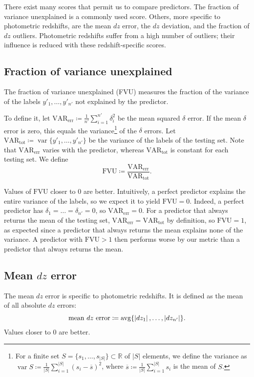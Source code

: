 \documentclass[11pt,twoside,openright]{report}
\newcommand\bbR{\mathbb{R}}
\newcommand\abs[1]{\left|#1\right|}
\DeclareMathOperator{\var}{var}
\DeclareMathOperator{\avg}{avg}
\begin{document}
There exist many scores that permit us to compare predictors. The fraction of variance unexplained is a commonly used score. Others, more specific to photometric redshifts, are the mean $dz$ error, the $dz$ deviation, and the fraction of $dz$ outliers. Photometric redshifts suffer from a high number of outliers; their influence is reduced with these redshift-specific scores.

\subsection{Fraction of variance unexplained}
\label{sec:fvu}
The fraction of variance unexplained (FVU) measures the fraction of the variance of the labels $y'_1, \dots, y'_{n'}$ not explained by the predictor.

To define it, let $\mathrm{VAR_{err}} \coloneqq \frac{1}{n'}\sum_{i=1}^{n'}\delta_i^2$ be the mean squared $\delta$ error. If the mean $\delta$ error is zero, this equals the variance\footnote{For a finite set $S = \{s_1, \dots, s_{\abs{S}}\} \subset \bbR$ of $\abs{S}$ elements, we define the variance as $\var S \coloneqq \frac1{\abs{S}}\sum_{i=1}^{\abs{S}}(s_i - \overline{s})^2$, where $\overline{s} \coloneqq \frac1{\abs{S}}\sum_{i=1}^{\abs{S}}s_i$ is the mean of $S$.} of the $\delta$ errors. Let $\mathrm{VAR_{tot}} \coloneqq \var\{y'_1, \dots, y'_{n'}\}$ be the variance of the labels of the testing set. Note that $\mathrm{VAR_{err}}$ varies with the predictor, whereas $\mathrm{VAR_{tot}}$ is constant for each testing set. We define \[
  \mathrm{FVU} \coloneqq \frac{\mathrm{VAR_{err}}}{\mathrm{VAR_{tot}}} \text{.}
\]

Values of $\mathrm{FVU}$ closer to $0$ are better. Intuitively, a perfect predictor explains the entire variance of the labels, so we expect it to yield $\mathrm{FVU} = 0$. Indeed, a perfect predictor has $\delta_1 = \dots = \delta_{n'} = 0$, so $\mathrm{VAR_{err}} = 0$. For a predictor that always returns the mean of the testing set, $\mathrm{VAR_{err}} = \mathrm{VAR_{tot}}$ by definition, so $\mathrm{FVU} = 1$, as expected since a predictor that always returns the mean explains none of the variance. A predictor with $\mathrm{FVU} > 1$ then performs worse by our metric than a predictor that always returns the mean.

\subsection{Mean $dz$ error}
\label{sec:mean_dz_error}
The mean $dz$ error is specific to photometric redshifts. It is defined as the mean of all absolute $dz$ errors:\[
  \textrm{mean $dz$ error} \coloneqq \avg\{\abs{dz_1}, \dots, \abs{dz_{n'}}\} \text.
\] Values closer to $0$ are better.
\end{document}
